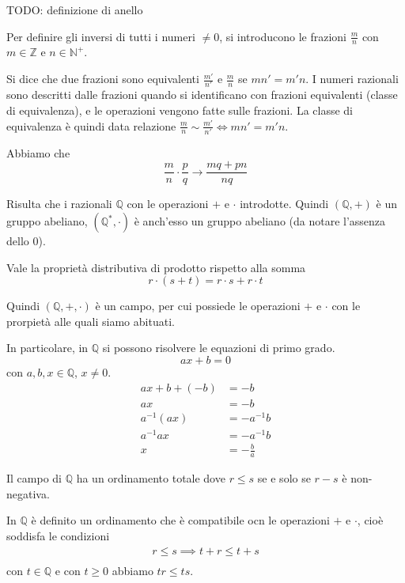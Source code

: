 \documentclass[a4paper]{article}
\begin{document}
TODO: definizione di anello

Per definire gli inversi di tutti i numeri \(\neq 0\), si introducono le frazioni \(\frac{m}{n}\)
con \(m\in\mathbb{Z}\) e \(n\in{\mathbb{N}}^+\).

Si dice che due frazioni sono equivalenti \(\frac{m'}{n'}\) e \(\frac{m}{n}\)
se \(mn' = m'n\).
I numeri razionali sono descritti dalle frazioni quando si identificano
con frazioni equivalenti (classe di equivalenza), e le operazioni vengono fatte sulle frazioni.
La classe di equivalenza è quindi data relazione \(\frac{m}{n} \sim \frac{m'}{n'} \iff mn'=m'n\).

Abbiamo che
\[
    \frac{m}{n} \cdot \frac{p}{q} \to \frac{mq+pn}{nq}
\]

Risulta che i razionali \(\mathbb{Q}\) con le operazioni \(+\) e \(\cdot\) introdotte.
Quindi \((\mathbb{Q}, +)\) è un gruppo abeliano, \(({\mathbb{Q}}^*, \cdot)\) è anch'esso un gruppo abeliano
(da notare l'assenza dello 0).

Vale la proprietà distributiva di prodotto rispetto alla somma
\[ r\cdot (s+t) = r\cdot s + r\cdot t \]

Quindi \((\mathbb{Q}, +, \cdot)\) è un campo, per cui possiede le operazioni \(+\) e \(\cdot\)
con le prorpietà alle quali siamo abituati.

\pagebreak

In particolare, in \(\mathbb{Q}\) si possono risolvere le equazioni di primo grado.
\[
    ax+b=0
\]
con \(a,b,x\in\mathbb{Q}\), \(x\neq 0\).
\begin{align*}
    ax+b+(-b)&=-b \\
    ax&= -b \\
    a^{-1}(ax) &= -a^{-1}b \\
    a^{-1}ax &= -a^{-1}b \\
    x &= -\frac{b}{a} 
\end{align*}

Il campo di \(\mathbb{Q}\) ha un ordinamento totale dove \(r \leq s\) se e solo se \(r - s\) è
non-negativa.

In \(\mathbb{Q}\) è definito un ordinamento che è compatibile ocn le operazioni \(+\) e \(\cdot\),
cioè soddisfa le condizioni
\begin{align*}
    r \leq s \implies t + r \leq t + s \\
\end{align*}
con \(t\in \mathbb{Q}\) e con \(t \geq 0\) abbiamo \(tr \leq ts\).

\end{document}
